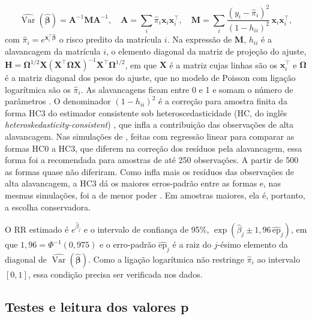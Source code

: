 \documentclass[12pt,a4paper]{article}
\begin{document}
\begin{equation}
  \widehat{\operatorname{Var}}(\hat{\boldsymbol{\beta}}) = \mathbf{A}^{-1}\mathbf{M}\mathbf{A}^{-1}, \quad \mathbf{A} = \sum_{i} \hat{\pi}_i \mathbf{x}_i\mathbf{x}_i^\top, \quad \mathbf{M} = \sum_{i} \frac{(y_i - \hat{\pi}_i)^2}{(1 - h_{ii})^2}\, \mathbf{x}_i\mathbf{x}_i^\top,
\end{equation}
com $\hat{\pi}_i = e^{\mathbf{x}_i^\top\hat{\boldsymbol{\beta}}}$ o risco predito da matrícula $i$. Na expressão de $\mathbf{M}$, $h_{ii}$ é a alavancagem da matrícula $i$, o elemento diagonal da matriz de projeção do ajuste, $\mathbf{H} = \boldsymbol{\Omega}^{1/2}\mathbf{X}(\mathbf{X}^\top\boldsymbol{\Omega}\mathbf{X})^{-1}\mathbf{X}^\top\boldsymbol{\Omega}^{1/2}$, em que $\mathbf{X}$ é a matriz cujas linhas são os $\mathbf{x}_i^\top$ e $\boldsymbol{\Omega}$ é a matriz diagonal dos pesos do ajuste, que no modelo de Poisson com ligação logarítmica são os $\hat{\pi}_i$. As alavancagens ficam entre 0 e 1 e somam o número de parâmetros \citep[pp.~127, 136--138]{agresti2015foundations}. O denominador $(1-h_{ii})^2$ é a correção para amostra finita da forma HC3 do estimador consistente sob heteroscedasticidade (HC, do inglês \textit{heteroskedasticity-consistent}) \citep{zeileis2004econometric,zeileis2006object}, que infla a contribuição das observações de alta alavancagem. Nas simulações de \citet[pp.~217, 222--223]{long2000using}, feitas com regressão linear para comparar as formas HC0 a HC3, que diferem na correção dos resíduos pela alavancagem, essa forma foi a recomendada para amostras de até 250 observações. A partir de 500 as formas quase não diferiram. Como infla mais os resíduos das observações de alta alavancagem, a HC3 dá os maiores erros-padrão entre as formas e, nas mesmas simulações, foi a de menor poder \citep[pp.~221--222]{long2000using}. Em amostras maiores, ela é, portanto, a escolha conservadora.

O RR estimado é $e^{\hat\beta_j}$ e o intervalo de confiança de 95\%, $\exp(\hat\beta_j \pm 1{,}96\,\widehat{\text{ep}}_j)$, em que $1{,}96 = \Phi^{-1}(0{,}975)$ e o erro-padrão $\widehat{\text{ep}}_j$ é a raiz do $j$-ésimo elemento da diagonal de $\widehat{\operatorname{Var}}(\hat{\boldsymbol{\beta}})$. Como a ligação logarítmica não restringe $\hat{\pi}_i$ ao intervalo $[0, 1]$, essa condição precisa ser verificada nos dados.

\subsection{Testes e leitura dos valores p}
\label{sec:fund-testes}
\end{document}
